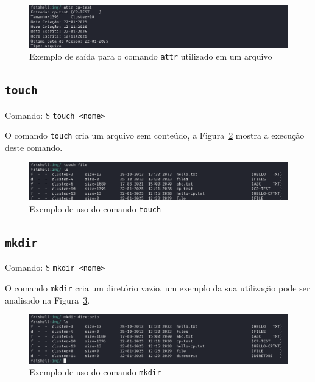 \documentclass[
    12pt,				%
    oneside,   	        %
    a4paper,			%
    english,			%
    french,				%
    spanish,			%
    brazil,				%
    ]{pacotes/abntex2}
\begin{document}
\begin{figure}[H]
    \centering
    \includegraphics[width=450pt]{figuras/resultados/4-attr.PNG}
    \caption{Exemplo de saída para o comando \texttt{attr} utilizado em um arquivo}
    \label{fig:attr}
\end{figure}


\subsection{\texttt{touch}}
\label{subsec:touch}
Comando: \$ \texttt{touch <nome>} 

O comando \texttt{touch} cria um arquivo sem conteúdo, a Figura~\ref{fig:touch} mostra a execução deste comando.

\begin{figure}[h!]
    \centering
    \includegraphics[width=450pt]{figuras/resultados/8-touch.PNG}
    \caption{Exemplo de uso do comando \texttt{touch}}
    \label{fig:touch}
\end{figure}


\subsection{\texttt{mkdir}}
\label{subsec:mkdir}
Comando: \$ \texttt{mkdir <nome>}

O comando \texttt{mkdir} cria um diretório vazio, um exemplo da sua utilização pode ser analisado na Figura~\ref{fig:mkdir}.

\begin{figure}[H]
    \centering
    \includegraphics[width=450pt]{figuras/resultados/9-mkdir.PNG}
    \caption{Exemplo de uso do comando \texttt{mkdir}}
    \label{fig:mkdir}
\end{figure}
\end{document}
